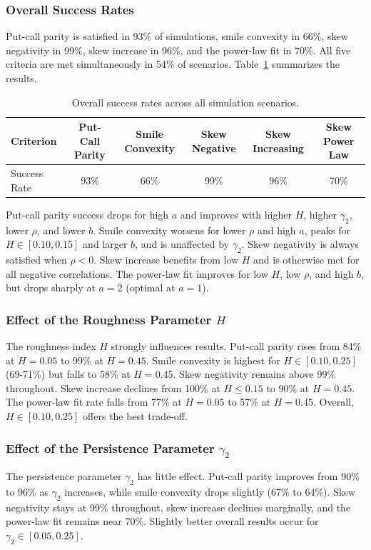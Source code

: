 \subsubsection*{Overall Success Rates}
Put-call parity is satisfied in 93\% of simulations, smile convexity in 66\%, skew negativity in 99\%, skew increase in 96\%, and the power-law fit in 70\%. All five criteria are met simultaneously in 54\% of scenarios. Table~\ref{tab:OverallSuccessRates} summarizes the results.
\begin{table}[H]
    \centering
    \small
    \begin{tabular}{lccccc}
        \toprule
        Criterion & Put-Call Parity & Smile Convexity & Skew Negative & Skew Increasing & Skew Power Law \\
        \midrule
        Success Rate & 93\% & 66\% & 99\% & 96\% & 70\% \\
        \bottomrule
    \end{tabular}
    \caption{Overall success rates across all simulation scenarios.}
    \label{tab:OverallSuccessRates}
\end{table}

Put-call parity success drops for high $a$ and improves with higher $H$, higher $\gamma_2$, lower $\rho$, and lower $b$. 
Smile convexity worsens for lower $\rho$ and high $a$, peaks for $H \in [0.10, 0.15]$ and larger $b$, and is unaffected by $\gamma_2$.
Skew negativity is always satisfied when $\rho < 0$.
Skew increase benefits from low $H$ and is otherwise met for all negative correlations.
The power-law fit improves for low $H$, low $\rho$, and high $b$, but drops sharply at $a = 2$ (optimal at $a = 1$).

\subsubsection*{Effect of the Roughness Parameter \texorpdfstring{$H$}{H}}
The roughness index $H$ strongly influences results. Put-call parity rises from 84\% at $H=0.05$ to 99\% at $H=0.45$. Smile convexity is highest for $H \in [0.10, 0.25]$ (69-71\%) but falls to 58\% at $H=0.45$. Skew negativity remains above 99\% throughout. Skew increase declines from 100\% at $H \leq 0.15$ to 90\% at $H=0.45$. The power-law fit rate falls from 77\% at $H=0.05$ to 57\% at $H=0.45$. Overall, $H \in [0.10, 0.25]$ offers the best trade-off.

\subsubsection*{Effect of the Persistence Parameter \texorpdfstring{$\gamma_2$}{gamma2}}
The persistence parameter $\gamma_2$ has little effect. Put-call parity improves from 90\% to 96\% as $\gamma_2$ increases, while smile convexity drops slightly (67\% to 64\%). Skew negativity stays at 99\% throughout, skew increase declines marginally, and the power-law fit remains near 70\%. Slightly better overall results occur for $\gamma_2 \in [0.05, 0.25]$.

